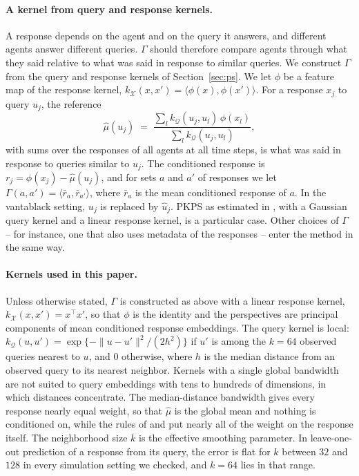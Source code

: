 \documentclass{article}
\theoremstyle{plain}
\theoremstyle{definition}
\newcommand{\Q}{\mathcal{Q}}
\newcommand{\X}{\mathcal{X}}
\begin{document}
\paragraph{A kernel from query and response kernels.} A response depends on the agent and on the query it answers, and different agents answer different queries. $\Gamma$ should therefore compare agents through what they said relative to what was said in response to similar queries. We construct $\Gamma$ from the query and response kernels of Section~\ref{sec:ps}. We let $\phi$ be a feature map of the response kernel, $k_\X(x,x')=\langle\phi(x),\phi(x')\rangle$. For a response $x_j$ to query $u_j$, the reference
\begin{equation}
\label{eq:reference}
\hat\mu(u_j) \;=\; \frac{\sum_{l} k_\Q(u_j,u_l)\,\phi(x_l)}{\sum_{l} k_\Q(u_j,u_l)},
\end{equation}
with sums over the responses of all agents at all time steps, is what was said in response to queries similar to $u_j$. The conditioned response is $r_j = \phi(x_j) - \hat\mu(u_j)$, and for sets $a$ and $a'$ of responses we let $\Gamma(a,a') = \langle \bar r_a, \bar r_{a'}\rangle$, where $\bar r_a$ is the mean conditioned response of $a$. In the vantablack setting, $u_j$ is replaced by $\hat u_j$. PKPS as estimated in \citet{pkps2026}, with a Gaussian query kernel and a linear response kernel, is a particular case. Other choices of $\Gamma$ -- for instance, one that also uses metadata of the responses -- enter the method in the same way.

\paragraph{Kernels used in this paper.} Unless otherwise stated, $\Gamma$ is constructed as above with a linear response kernel, $k_\X(x,x')=x^\top x'$, so that $\phi$ is the identity and the perspectives are principal components of mean conditioned response embeddings. The query kernel is local: $k_\Q(u,u')=\exp\{-\|u-u'\|^2/(2h^2)\}$ if $u'$ is among the $k=64$ observed queries nearest to $u$, and $0$ otherwise, where $h$ is the median distance from an observed query to its nearest neighbor. Kernels with a single global bandwidth are not suited to query embeddings with tens to hundreds of dimensions, in which distances concentrate. The median-distance bandwidth gives every response nearly equal weight, so that $\hat\mu$ is the global mean and nothing is conditioned on, while the rules of \citet{scott1992multivariate} and \citet{silverman1986density} put nearly all of the weight on the response itself. The neighborhood size $k$ is the effective smoothing parameter. In leave-one-out prediction of a response from its query, the error is flat for $k$ between $32$ and $128$ in every simulation setting we checked, and $k=64$ lies in that range.
\end{document}
